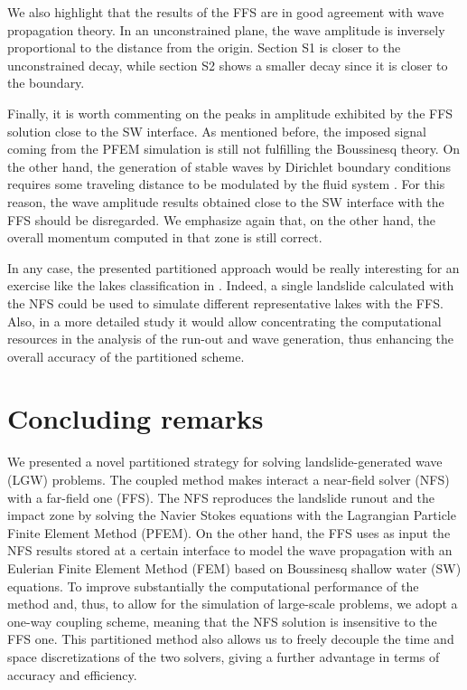 We also highlight that the results of the FFS are in good agreement with wave propagation theory. In an unconstrained plane, the wave amplitude is inversely proportional to the distance from the origin. Section S1 is closer to the unconstrained decay, while section S2 shows a smaller decay since it is closer to the boundary.

Finally, it is worth commenting on the peaks in amplitude exhibited by the FFS solution close to the SW interface. As mentioned before, the imposed signal coming from the PFEM simulation is still not fulfilling the Boussinesq theory. On the other hand, the generation of stable waves by Dirichlet boundary conditions requires some traveling distance to be modulated by the fluid system \cite{wu2018}. For this reason, the wave amplitude results obtained close to the SW interface with the FFS should be disregarded. We emphasize again that, on the other hand, the overall momentum computed in that zone is still correct.

In any case, the presented partitioned approach would be really interesting for an exercise like the lakes classification in \cite{app112411614}. Indeed, a single landslide calculated with the NFS could be used to simulate different representative lakes with the FFS. Also, in a more detailed study it would allow concentrating the computational resources in the analysis of the run-out and wave generation, thus enhancing the overall accuracy of the partitioned scheme.



\section{Concluding remarks}

We presented a novel partitioned strategy for solving landslide-generated wave (LGW) problems. The coupled method makes interact a near-field solver (NFS) with a far-field one (FFS). The NFS reproduces the landslide runout and the impact zone by solving the Navier Stokes equations with the Lagrangian Particle Finite Element Method (PFEM). On the other hand, the FFS uses as input the NFS results stored at a certain interface to model the wave propagation with an Eulerian Finite Element Method (FEM) based on Boussinesq shallow water (SW) equations. To improve substantially the computational performance of the method and, thus, to allow for the simulation of large-scale problems, we adopt a one-way coupling scheme, meaning that the NFS solution is insensitive to the FFS one. This partitioned method also allows us to freely decouple the time and space discretizations of the two solvers, giving a further advantage in terms of accuracy and efficiency.

